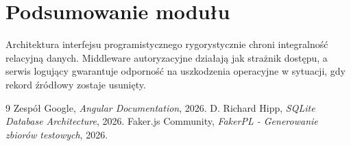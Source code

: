 \documentclass[a4paper,12pt]{report}
\begin{document}
\section{Podsumowanie modułu}
Architektura interfejsu programistycznego rygorystycznie chroni integralność relacyjną danych. Middleware autoryzacyjne działają jak strażnik dostępu, a serwis logujący gwarantuje odporność na uszkodzenia operacyjne w sytuacji, gdy rekord źródłowy zostaje usunięty.

\begin{thebibliography}{9}
  Zespół Google, \emph{Angular Documentation}, 2026.
  D. Richard Hipp, \emph{SQLite Database Architecture}, 2026.
  Faker.js Community, \emph{FakerPL - Generowanie zbiorów testowych}, 2026.
\end{thebibliography}

\printindex
\end{document}
